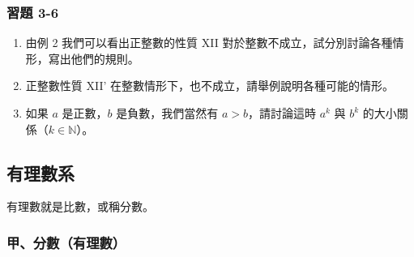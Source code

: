 \subsubsection*{習題 3-6}\label{sec:ex3-6}

\begin{enumerate}[1., leftmargin=2em]
  \item 由例 2 我們可以看出正整數的性質 XII 對於整數不成立，試分別討論各種情形，寫出他們的規則。
  \item 正整數性質 XII' 在整數情形下，也不成立，請舉例說明各種可能的情形。
  \item 如果 $a$ 是正數，$b$ 是負數，我們當然有 $a > b$，請討論這時 $a^k$ 與 $b^k$ 的大小關係（$k \in \mathbb{N}$）。
\end{enumerate}

\subsection{有理數系}\label{sec:3-4}

有理數就是比數，或稱分數。

\subsubsection*{甲、分數（有理數）}\label{subsec:fractions}

